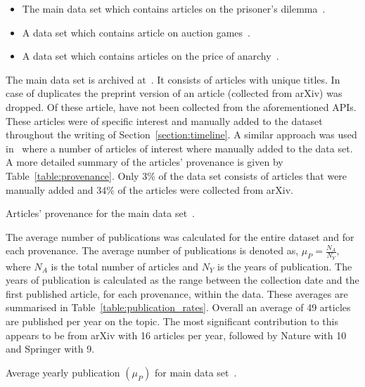 \documentclass{article}
\theoremstyle{definition}
\newcommand{\totalarticles}{}
\newcommand{\manual}{}
\begin{document}
\begin{itemize}
    \item The main data set which contains articles on the prisoner's dilemma~\cite{pd_data_2018}.
    \item A data set which contains article on auction games~\cite{auction_data_2018}.
    \item A data set which contains articles on the price of anarchy~\cite{anarchy_data_2018}.
\end{itemize}

The main data set is archived at~\cite{pd_data_2018}. It
consists of \totalarticles articles with unique titles. In case of duplicates
the preprint version of an article (collected from arXiv) was dropped.
Of these \totalarticles article, \manual have not been collected from the
aforementioned APIs. These articles were of specific interest and manually added
to the dataset throughout the writing of Section~\ref{section:timeline}. A
similar approach was used in~\cite{Liu2015} where a number of articles of interest
where manually added to the data set. A more
detailed summary of the articles' provenance is given by Table~\ref{table:provenance}.
Only 3\% of the data set consists of articles that were manually added and 34\% of the
articles were collected from arXiv.

\begin{table}[!hbtp]
    \begin{center}
    
    \end{center}
    \caption{Articles' provenance for the main data set~\cite{pd_data_2018}.}
    \label{table:provenance}
\end{table}

The average number of publications was calculated for the entire dataset and for
each provenance. The average number of publications is denoted as, \(\mu_P =
\frac{N_A}{N_Y},\) where \(N_A\) is the total number of articles and \(N_Y\) is
the years of publication. The years of publication is calculated as the range
between the collection date and the first published article, for each
provenance, within the data. These averages are summarised in
Table~\ref{table:publication_rates}. Overall an average of 49 articles are
published per year on the topic. The most significant contribution to this
appears to be from arXiv with 16 articles per year, followed by Nature with 10
and Springer with 9.

\begin{table}[!hbtp]
    \begin{center}
    
    \end{center}
    \caption{Average yearly publication $(\mu_P)$ for main data set~\cite{pd_data_2018}.}
    \label{table:publication_rates}
\end{table}
\end{document}
